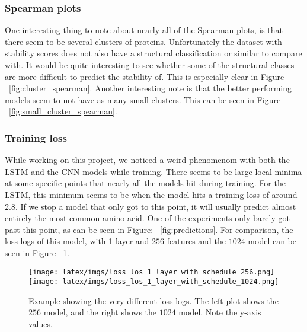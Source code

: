 \subsubsection{Spearman plots}
One interesting thing to note about nearly all of the Spearman plots, is that there seem to be several clusters of proteins. Unfortunately the dataset with stability scores does not also have a structural classification or similar to compare with. It would be quite interesting to see whether some of the structural classes are more difficult to predict the stability of. This is especially clear in Figure ~\ref{fig:cluster_spearman}. Another interesting note is that the better performing models seem to not have as many small clusters. This can be seen in Figure ~\ref{fig:small_cluster_spearman}.

\subsubsection{Training loss}
While working on this project, we noticed a weird phenomenom with both the LSTM and the CNN models while training. There seems to be large local minima at some specific points that nearly all the models hit during training. For the LSTM, this minimum seems to be when the model hits a training loss of around $2.8$. If we stop a model that only got to this point, it will usually predict almost entirely the most common amino acid. One of the experiments only barely got past this point, as can be seen in Figure: ~\ref{fig:predictions}. For comparison, the loss logs of this model, with 1-layer and $256$ features and the $1024$ model can be seen in Figure ~\ref{fig:loss_weird}.

\begin{figure}[!ht]
  \centering
  \texttt{[image: latex/imgs/loss\_los\_1\_layer\_with\_schedule\_256.png]}
  \texttt{[image: latex/imgs/loss\_los\_1\_layer\_with\_schedule\_1024.png]}
  \caption{Example showing the very different loss logs. The left plot shows the $256$ model, and the right shows the $1024$ model. Note the y-axis values.}
  \label{fig:loss_weird}
\end{figure}